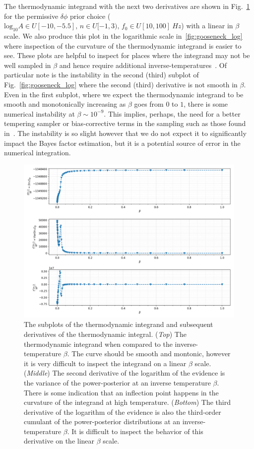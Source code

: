 The thermodynamic integrand with the next two derivatives are shown in Fig.~\ref{fig:gooseneck_linear} for the permissive $\delta \phi$ prior choice ($\mathrm{log}_{10} A \in U[-10, -5.5], \, n \in U[-1, 3), \, f_0 \in U[10, 100]~Hz$) with a linear in $\beta$ scale. We also produce this plot in the logarithmic scale in~\ref{fig:gooseneck_log} where inspection of the curvature of the thermodynamic integrand is easier to see. These plots are helpful to inspect for places where the integrand may not be well sampled in $\beta$ and hence require additional inverse-temperatures~\cite{liu2016evaluating, de2011free, de2013comparison}. Of particular note is the instability in the second (third) subplot of Fig.~\ref{fig:gooseneck_log} where the second (third) derivative is not smooth in $\beta$. Even in the first subplot, where we expect the thermodynamic integrand to be smooth and monotonically increasing as $\beta$ goes from $0$ to $1$, there is some numerical instability at $\beta \sim 10^{-9}$. This implies, perhaps, the need for a better tempering sampler or bias-corrective terms in the sampling such as those found in~\cite{oates2017control,evans2019thermodynamic}. The instability is so slight however that we do not expect it to significantly impact the Bayes factor estimation, but it is a potential source of error in the numerical integration.

\begin{figure}[th]
\centering
\includegraphics[width=0.9\columnwidth]{figs/chapter6/gooseneck_plots_linear.png}
\caption{The subplots of the thermodynamic integrand and subsequent derivatives of the thermodynamic integral. (\textit{Top}) The thermodynamic integrand when compared to the inverse-temperature $\beta$. The curve should be smooth and montonic, however it is very difficult to inspect the integrand on a linear $\beta$ scale. (\textit{Middle}) The second derivative of the logarithm of the evidence is the variance of the power-posterior at an inverse temperature $\beta$. There is some indication that an inflection point happens in the curvature of the integrand at high temperature. (\textit{Bottom}) The third derivative of the logarithm of the evidence is also the third-order cumulant of the power-posterior distributions at an inverse-temperature $\beta$. It is difficult to inspect the behavior of this derivative on the linear $\beta$ scale.}
\label{fig:gooseneck_linear}
\end{figure}

